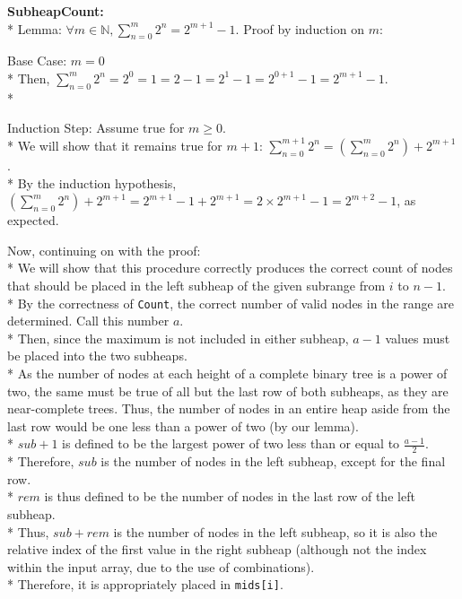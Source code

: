 \documentclass[letterpaper, reqno, 11pt]{article}
\newcommand{\NN}{\mathbb{N}}
\begin{document}
\begin{description}
	\item{\bf SubheapCount:}\\*
	Lemma: $\forall m\in\NN, \sum_{n=0}^m2^n=2^{m+1}-1$.
	Proof by induction on $m$:
	\begin{description}
		\item{Base Case:} $m=0$\\*
		Then, $\sum_{n=0}^m2^n=2^0=1=2-1=2^{1}-1=2^{0+1}-1=2^{m+1}-1$.\\*
		\item{Induction Step:} Assume true for $m\geq0$.\\*
		We will show that it remains true for $m+1$:
		$\sum_{n=0}^{m+1}2^n=\left(\sum_{n=0}^{m}2^n\right)+2^{m+1}$.\\*
		By the induction hypothesis,
		$\left(\sum_{n=0}^{m}2^n\right)+2^{m+1}=2^{m+1}-1+2^{m+1}=2\times2^{m+1}-1=2^{m+2}-1$,
		as expected.
	\end{description}
	Now, continuing on with the proof:\\*
	We will show that this procedure correctly produces the correct count
	of nodes that should be placed in the left subheap of the given subrange from $i$ to $n-1$.\\*
	By the correctness of \verb|Count|, the correct number of valid nodes in the range are determined.
	Call this number $a$.\\*
	Then, since the maximum is not included in either subheap, $a-1$ values must be placed into the
	two subheaps.\\*
	As the number of nodes at each height of a complete binary tree is a power of two, the same must be
	true of all but the last row of both subheaps, as they are near-complete trees.
	Thus, the number of nodes in an entire heap aside from the last row would be
	one less than a power of two (by our lemma).\\*
	$sub+1$ is defined to be the largest power of two less than or equal to $\frac{a-1}{2}$.\\*
	Therefore, $sub$ is the number of nodes in the left subheap, except for the final row.\\*
	$rem$ is thus defined to be the number of nodes in the last row of the left subheap.\\*
	Thus, $sub+rem$ is the number of nodes in the left subheap, so it is also the relative index
	of the first value in the right subheap (although not the index within the input array, due
	to the use of combinations).\\*
	Therefore, it is appropriately placed in \verb|mids[i]|.


\end{description}
\end{document}
